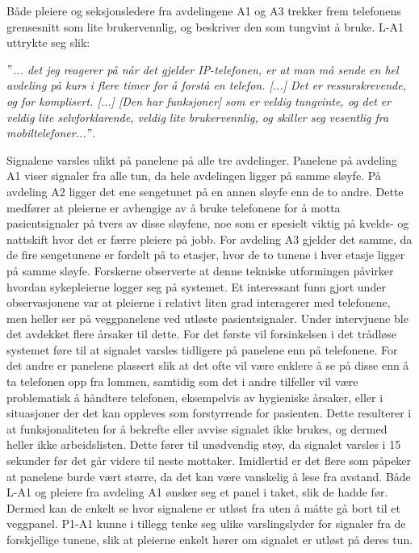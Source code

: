 \noindent
Både pleiere og seksjonsledere fra avdelingene A1 og A3 trekker frem telefonens grensesnitt som lite brukervennlig, og beskriver den som tungvint å bruke. L-A1 uttrykte seg slik:

\noindent
\textit{ $"$... det jeg reagerer på når det gjelder IP-telefonen, er at man må sende en hel avdeling på kurs i flere timer for å forstå en telefon. [...] Det er ressurskrevende, og for komplisert. [...] [Den har funksjoner] som er veldig tungvinte, og det er veldig lite selvforklarende, veldig lite brukervennlig, og skiller seg vesentlig fra mobiltelefoner...$"$}.

\noindent
Signalene varsles ulikt på panelene på alle tre avdelinger. Panelene på avdeling A1 viser signaler fra alle tun, da hele avdelingen ligger på samme sløyfe. På avdeling A2 ligger det ene sengetunet på en annen sløyfe enn de to andre. Dette medfører at pleierne er avhengige av å bruke telefonene for å motta pasientsignaler på tvers av disse sløyfene, noe som er spesielt viktig på kvelds- og nattskift hvor det er færre pleiere på jobb. For avdeling A3 gjelder det samme, da de fire sengetunene er fordelt på to etasjer, hvor de to tunene i hver etasje ligger på samme sløyfe. Forskerne observerte at denne tekniske utformingen påvirker hvordan sykepleierne logger seg på systemet. Et interessant funn gjort under observasjonene var at pleierne i relativt liten grad interagerer med telefonene, men heller ser på veggpanelene ved utløste pasientsignaler. Under intervjuene ble det avdekket flere årsaker til dette. For det første vil forsinkelsen i det trådløse systemet føre til at signalet varsles tidligere på panelene enn på telefonene. For det andre er panelene plassert slik at det ofte vil være enklere å se på disse enn å ta telefonen opp fra lommen, samtidig som det i andre tilfeller vil være problematisk å håndtere telefonen, eksempelvis av hygieniske årsaker, eller i situasjoner der det kan oppleves som forstyrrende for pasienten. Dette resulterer i at funksjonaliteten for å bekrefte eller avvise signalet ikke brukes, og dermed heller ikke arbeidslisten. Dette fører til unødvendig støy, da signalet varsles i 15 sekunder før det går videre til neste mottaker. Imidlertid er det flere som påpeker at panelene burde vært større, da det kan være vanskelig å lese fra avstand. Både L-A1 og pleiere fra avdeling A1 ønsker seg et panel i taket, slik de hadde før. Dermed kan de enkelt se hvor signalene er utløst fra uten å måtte gå bort til et veggpanel. P1-A1 kunne i tillegg tenke seg ulike varslingslyder for signaler fra de forskjellige tunene, slik at pleierne enkelt hører om signalet er utløst på deres tun.

